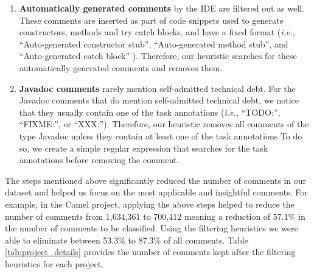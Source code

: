 \begin{enumerate}
\item \textbf{Automatically generated comments} by the IDE are filtered out as well. These comments are inserted as part of code snippets used to generate constructors, methods and try catch blocks, and have a fixed format (\textit{i.e.,} ``Auto-generated constructor stub'', ``Auto-generated method stub'', and ``Auto-generated catch block'' ). Therefore, our heuristic searches for these automatically generated comments and removes them. 

\item \textbf{Javadoc comments} rarely mention self-admitted technical debt. For the Javadoc comments that do mention self-admitted technical debt, we notice that they usually 
 contain one of the task annotations (\textit{i.e.,} ``TODO:'', ``FIXME:'', or ``XXX:''). Therefore, our heuristic removes all comments of the type Javadoc unless they contain at least one of the task annotations  To do so, we create a simple regular expression that searches for the task annotations before removing the comment.  
 
\end{enumerate} 


The steps mentioned above significantly reduced the number of comments in our dataset and helped us focus on the most applicable and insightful comments.  For example, in the Camel project, applying the above steps helped to reduce the number of comments from 1,634,361 to 700,412 meaning a reduction of 57.1\% in the number of comments to be classified.  Using the filtering heuristics we were able to eliminate between 53.3\% to 87.3\% of all comments. Table \ref{tab:project_details} provides the number of comments kept after the filtering heuristics for each project.


